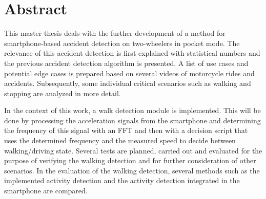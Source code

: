 \chapter*{Abstract}
This master-thesis deals with the further development of a method for smartphone-based accident detection on two-wheelers in pocket mode.
The relevance of this accident detection is first explained with statistical numbers and the previous accident detection algorithm is presented.
A list of use cases and potential edge cases is prepared based on several videos of motorcycle rides and accidents. Subsequently, some individual critical scenarios such as walking and stopping are analyzed in more detail.

In the context of this work, a walk detection module is implemented. This will be done by processing the acceleration signals from the smartphone and determining the frequency of this signal with an FFT and then with a decision script that uses the determined frequency and the measured speed to decide between walking/driving state.
Several tests are planned, carried out and evaluated for the purpose of verifying the walking detection and for further consideration of other scenarios.
In the evaluation of the walking detection, several methods such as the implemented activity detection and the activity detection integrated in the smartphone are compared.



\endgroup
\cleardoublepage